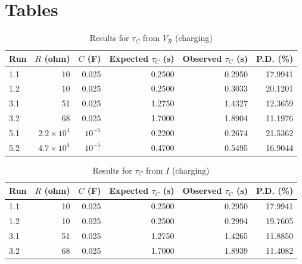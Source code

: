 \section{Tables}
%
\begin{table}[ht!]
    \begin{center}
        \begin{tabular}{|l|r|r|r|r|r|}
            \hline
            Run & $R$ (ohm) & $C$ (F) & Expected $\tau_{C}$ (s) & Observed $\tau_{C}$ (s) & P.D. (\%) \\
            \hline
            1.1 & 10 & 0.025 & 0.2500 & 0.2950 & 17.9941 \\
            1.2 & 10 & 0.025 & 0.2500 & 0.3033 & 20.1201 \\
            3.1 & 51 & 0.025 & 1.2750 & 1.4327 & 12.3659 \\
            3.2 & 68 & 0.025 & 1.7000 & 1.8904 & 11.1976 \\
            5.1 & $2.2 \times 10^{4}$ & $10^{-5}$ & 0.2200 & 0.2674 & 21.5362 \\
            5.2 & $4.7 \times 10^{4}$ & $10^{-5}$ & 0.4700 & 0.5495 & 16.9044 \\
            \hline
        \end{tabular}
    \end{center}
    \caption{Results for $\tau_{C}$ from $V_{R}$ (charging)}
\end{table}
%
\begin{table}[ht!]
    \begin{center}
        \begin{tabular}{|l|r|r|r|r|r|}
            \hline
            Run & $R$ (ohm) & $C$ (F) & Expected $\tau_{C}$ (s) & Observed $\tau_{C}$ (s) & P.D. (\%) \\
            \hline
            1.1 & 10 & 0.025 & 0.2500 & 0.2950 & 17.9941 \\
            1.2 & 10 & 0.025 & 0.2500 & 0.2994 & 19.7605 \\
            3.1 & 51 & 0.025 & 1.2750 & 1.4265 & 11.8850 \\
            3.2 & 68 & 0.025 & 1.7000 & 1.8939 & 11.4082 \\
            \hline
        \end{tabular}
    \end{center}
    \caption{Results for $\tau_{C}$ from $I$ (charging)}
\end{table}
%

